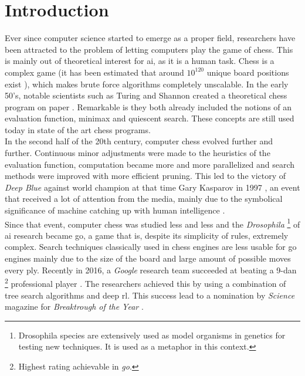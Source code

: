 \chapter{Introduction}

Ever since computer science started to emerge as a proper field, researchers have been attracted to the problem of letting computers play the game of chess. This is mainly out of theoretical interest for \gls{ai}, as it is a human task. Chess is a complex game (it has been estimated that around $10^{120}$ unique board positions exist \cite{shann50}), which makes brute force algorithms completely unscalable. In the early 50's, notable scientists such as Turing and Shannon created a theoretical chess program on paper \cite{shann50,tur53}. Remarkable is they both already included the notions of an evaluation function, minimax and quiescent search. These concepts are still used today in state of the art chess programs. \\

In the second half of the 20th century, computer chess evolved further and further. Continuous minor adjustments were made to the heuristics of the evaluation function, computation became more and more parallelized and search methods were improved with more efficient pruning. This led to the victory of \textit{Deep Blue} against world champion at that time Gary Kasparov in 1997 \cite{dblue02}, an event that received a lot of attention from the media, mainly due to the symbolical significance of machine catching up with human intelligence \cite{wstd97}. \\

Since that event, computer chess was studied less and less and the \textit{Drosophila} \footnote{Drosophila species are extensively used as model organisms in genetics for testing new techniques. It is used as a metaphor in this context.} of \gls{ai} research became go, a game that is, despite its simplicity of rules, extremely complex. Search techniques classically used in chess engines are less usable for go engines mainly due to the size of the board and large amount of possible moves every ply. Recently in 2016, a \textit{Google} research team succeeded at beating a 9-dan \footnote{Highest rating achievable in \textit{go}.} professional player \cite{alphago16}. The researchers achieved this by using a combination of tree search algorithms and deep \gls{rl}. This success lead to a nomination by \textit{Science} magazine for \textit{Breaktrough of the Year} \cite{scboy16}. \\

